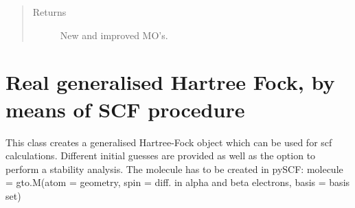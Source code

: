 \documentclass[letterpaper,10pt,english]{sphinxmanual}
\begin{document}
\begin{fulllineitems}
\begin{fulllineitems}
\begin{sphinxVerbatim}[commandchars=\\\{\}]
           
   
  
\end{sphinxVerbatim}
\begin{quote}\begin{description}
\item[{Returns}] \leavevmode
New and improved MO’s.

\end{description}\end{quote}

\end{fulllineitems}


\end{fulllineitems}

\label{\detokenize{Real_GHF:module-ghf.real_GHF}}

\chapter{Real generalised Hartree Fock, by means of SCF procedure}
\label{\detokenize{Real_GHF:real-generalised-hartree-fock-by-means-of-scf-procedure}}\label{\detokenize{Real_GHF::doc}}
This class creates a generalised Hartree-Fock object which can be used for scf calculations. Different initial guesses
are provided as well as the option to perform a stability analysis.
The molecule has to be created in pySCF:
molecule = gto.M(atom = geometry, spin = diff. in alpha and beta electrons, basis = basis set)
\end{document}
